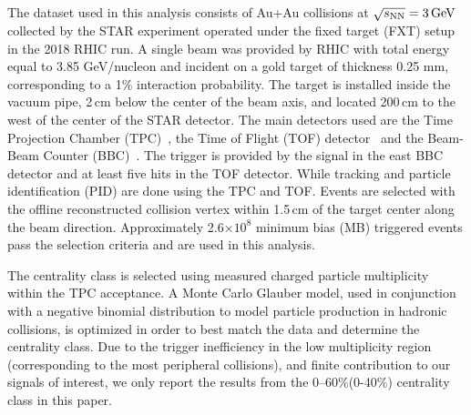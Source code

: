 \documentclass[%
 reprint,	
showpacs,
 amsmath,amssymb,
 aps,
 superscriptaddress,
]{revtex4-1}
\begin{document}
The dataset used in this analysis consists of Au+Au collisions at ${\sqrt{s_{\rm NN}} = \rm{3\,GeV}}$ collected by the STAR experiment operated under the fixed target (FXT) setup~\cite{Meehan_2016} in the 2018 RHIC run. %
A single beam was provided by RHIC with total energy equal to 3.85 GeV/nucleon and incident on a gold target of thickness 0.25 mm, corresponding to a 1\% interaction probability.
The target is installed inside the vacuum pipe, 2\,cm below the center of the beam axis, and located 200\,cm to the west of the center of the STAR detector. The main detectors used are the Time Projection Chamber (TPC)~\cite{TPC}, the Time of Flight (TOF) detector~\cite{TOF} and the Beam-Beam Counter (BBC)~\cite{BBC_Whitten}. The trigger is provided by the signal in the east BBC detector and at least five hits in the TOF detector. While tracking and particle identification (PID) are done using the TPC and TOF. Events are selected with the offline reconstructed collision vertex within 1.5\,cm of the target center along the beam direction. Approximately 2.6$\times 10^{8}$ minimum bias (MB) triggered events pass the selection criteria and are used in this analysis. 

The centrality class is selected using measured charged particle multiplicity within the TPC acceptance. 
A Monte Carlo Glauber model, used in conjunction with a negative binomial distribution to model particle production in hadronic collisions, is optimized in order to best match the data and determine the centrality class. Due to the trigger inefficiency in the low multiplicity region (corresponding to the most peripheral collisions), and finite contribution to our signals of interest, we only report the results from the 0--60\%(0-40\%) centrality class in this paper.
\end{document}
